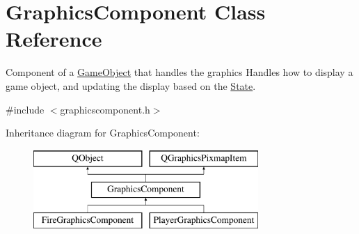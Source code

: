 \hypertarget{classGraphicsComponent}{\section{Graphics\-Component Class Reference}
\label{classGraphicsComponent}
}


Component of a \hyperlink{classGameObject}{Game\-Object} that handles the graphics Handles how to display a game object, and updating the display based on the \hyperlink{classState}{State}.  




{\ttfamily \#include $<$graphicscomponent.\-h$>$}

Inheritance diagram for Graphics\-Component\-:\begin{figure}[H]
\begin{center}
\leavevmode
\includegraphics[height=3.000000cm]{classGraphicsComponent}
\end{center}
\end{figure}
